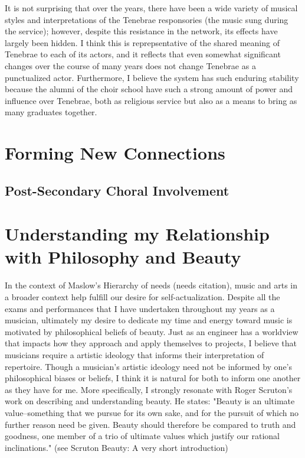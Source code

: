 \documentclass{article} %
\begin{document}
\begin{multicols}{2}
It is not surprising that over the years, there have been a wide variety of musical styles and interpretations of the Tenebrae responsories (the music sung during the service); however, despite this resistance in the network, its effects have largely been hidden.
I think this is reprepsentative of the shared meaning of Tenebrae to each of its actors, and it reflects that even somewhat significant changes over the course of many years does not change Tenebrae as a punctualized actor.
Furthermore, I believe the system has such enduring stability because the alumni of the choir school have such a strong amount of power and influence over Tenebrae, both as religious service but also as a means to bring as many graduates together.

\section{Forming New Connections}

\subsection{Post-Secondary Choral Involvement}

\section{Understanding my Relationship with Philosophy and Beauty}

In the context of Maslow's Hierarchy of needs (needs citation), music and arts in a broader context help fulfill our desire for self-actualization.
Despite all the exams and performances that I have undertaken throughout my years as a musician, ultimately my desire to dedicate my time and energy toward music is motivated by philosophical beliefs of beauty.
Just as an engineer has a worldview that impacts how they approach and apply themselves to projects, I believe that musicians require a artistic ideology that informs their interpretation of repertoire.
Though a musician's artistic ideology need not be informed by one's philosophical biases or beliefs, I think it is natural for both to inform one another as they have for me.
More specifically, I strongly resonate with Roger Scruton's work on describing and understanding beauty. 
He states: "Beauty is an ultimate value–something that we pursue for its own sake, and for the pursuit of which no further reason need be given. Beauty should therefore be compared to truth and goodness, one member of a trio of ultimate values which justify our rational inclinations." (see Scruton Beauty: A very short introduction)


\end{multicols}
\end{document}
